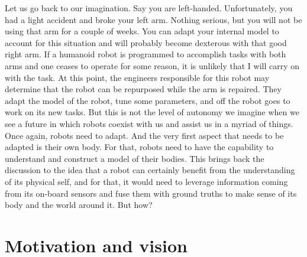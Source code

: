 Let us go back to our imagination. Say you are left-handed. Unfortunately, you had a light accident and broke your left arm. Nothing serious, but you will not be using that arm for a couple of weeks. You can adapt your internal model to account for this situation and will probably become dexterous with that good right arm. If a humanoid robot is programmed to accomplish tasks with both arms and one ceases to operate for some reason, it is unlikely that I will carry on with the task. At this point, the engineers responsible for this robot may determine that the robot can be repurposed while the arm is repaired. They adapt the model of the robot, tune some parameters, and off the robot goes to work on its new tasks. But this is not the level of autonomy we imagine when we see a future in which robots coexist with us and assist us in a myriad of things. Once again, robots need to adapt. And the very first aspect that needs to be adapted is their own body. For that, robots need to have the capability to understand and construct a model of their bodies. This brings back the discussion to the idea that a robot can certainly benefit from the understanding of its physical self, and for that, it would need to leverage information coming from its on-board sensors and fuse them with ground truths to make sense of its body and the world around it. But how?


\section{Motivation and vision}
